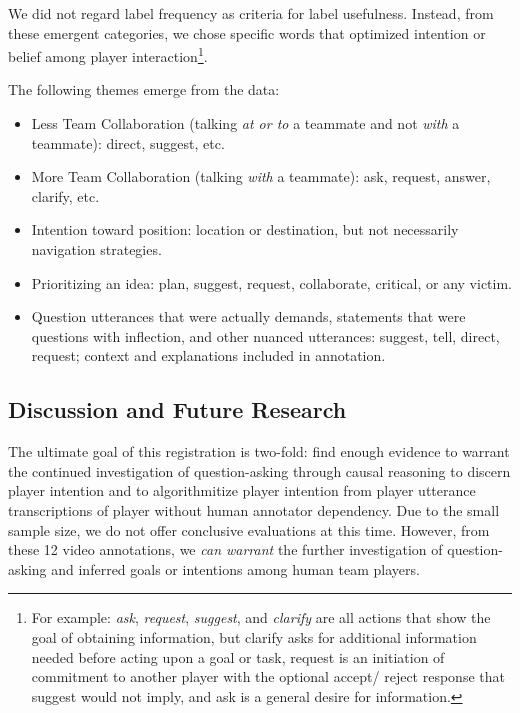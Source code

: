 We did not regard label frequency as criteria for label usefulness. Instead, from these emergent categories, we chose specific words that optimized intention or belief among player interaction\footnote{For example: \emph{ask}, \emph{request}, \emph{suggest}, and \emph{clarify} are all actions that show the goal of obtaining information, but clarify asks for additional information needed before acting upon a goal or task, request is an initiation of commitment to another player with the optional accept/ reject response that suggest would not imply, and ask is a general desire for information.}. 

The following themes emerge from the data:
\begin{itemize}
    \item Less Team Collaboration (talking \emph{at or to} a teammate and not \emph{with} a teammate): direct, suggest, etc.
    \item More Team Collaboration (talking \emph{with} a teammate): ask, request, answer, clarify, etc.
    \item Intention toward position: location or destination, but not necessarily navigation strategies.
    \item Prioritizing an idea: plan, suggest, request, collaborate, critical, or any victim.
    \item Question utterances that were actually demands, statements that were questions with inflection, and other nuanced utterances: suggest, tell, direct, request; context and explanations included in annotation.
\end{itemize}


\subsection{Discussion and Future Research}

The ultimate goal of this registration is two-fold: find enough evidence to warrant the continued investigation of question-asking through causal reasoning to discern player intention and to algorithmitize player intention from player utterance transcriptions of player without human annotator dependency. Due to the small sample size, we do not offer conclusive evaluations at this time. However, from these 12 video annotations, we \emph{can warrant} the further investigation of question-asking and inferred goals or intentions among human team players.

